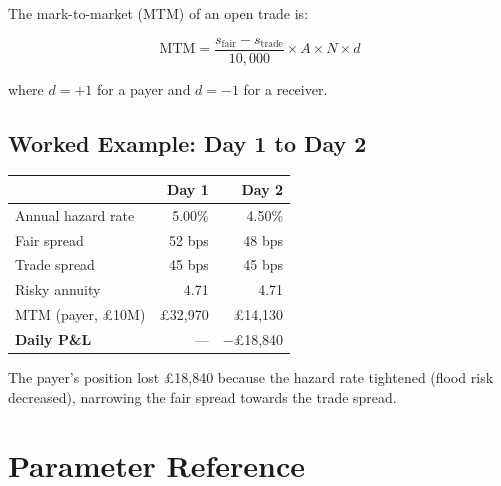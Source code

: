 \documentclass[11pt,a4paper]{article}
\begin{document}
The mark-to-market (MTM) of an open trade is:

\[
  \text{MTM} = \frac{s_{\mathrm{fair}} - s_{\mathrm{trade}}}{10{,}000}
               \times A \times N \times d
\]

\noindent where $d = +1$ for a payer and $d = -1$ for a receiver.

\subsection{Worked Example: Day 1 to Day 2}

\begin{center}
\begin{tabular}{lrr}
\toprule
& \textbf{Day 1} & \textbf{Day 2} \\
\midrule
Annual hazard rate & 5.00\% & 4.50\% \\
Fair spread        & 52 bps & 48 bps \\
Trade spread       & 45 bps & 45 bps \\
Risky annuity      & 4.71   & 4.71 \\
\midrule
MTM (payer, \pounds10M) & \pounds32,970 & \pounds14,130 \\
\midrule
\textbf{Daily P\&L} & --- & $-$\pounds18,840 \\
\bottomrule
\end{tabular}
\end{center}

\noindent The payer's position lost \pounds18,840 because the hazard rate
tightened (flood risk decreased), narrowing the fair spread towards the
trade spread.


\section{Parameter Reference}
\label{ch:reference}
\end{document}
